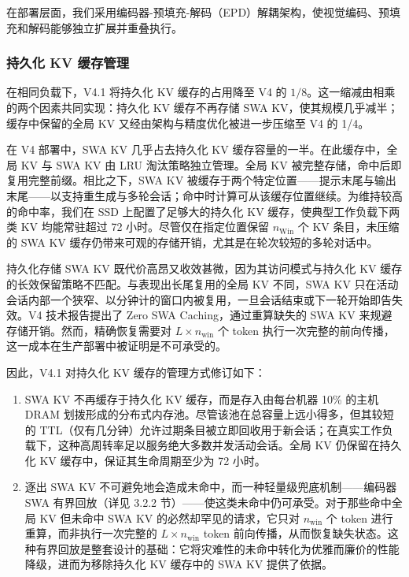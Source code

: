 \documentclass[
  10
]{article}
\begin{document}
在部署层面，我们采用编码器-预填充-解码（EPD）解耦架构，使视觉编码、预填充和解码能够独立扩展并重叠执行。
\subsubsection{持久化 KV 缓存管理}\label{persistent-kv-cache-management}

在相同负载下，V4.1 将持久化 KV 缓存的占用降至 V4 的 \(1 / 8\)。这一缩减由相乘的两个因素共同实现：持久化 KV 缓存不再存储 SWA KV，使其规模几乎减半；缓存中保留的全局 KV 又经由架构与精度优化被进一步压缩至 V4 的 1/4。

在 V4 部署中，SWA KV 几乎占去持久化 KV 缓存容量的一半。在此缓存中，全局 KV 与 SWA KV 由 LRU 淘汰策略独立管理。全局 KV 被完整存储，命中后即复用完整前缀。相比之下，SWA KV 被缓存于两个特定位置——提示末尾与输出末尾——以支持重生成与多轮会话；命中时计算可从该缓存位置继续。为维持较高的命中率，我们在 SSD 上配置了足够大的持久化 KV 缓存，使典型工作负载下两类 KV 均能常驻超过 72 小时。尽管仅在指定位置保留 \(n _ { \mathrm { W i n } }\) 个 KV 条目，未压缩的 SWA KV 缓存仍带来可观的存储开销，尤其是在轮次较短的多轮对话中。

持久化存储 SWA KV 既代价高昂又收效甚微，因为其访问模式与持久化 KV 缓存的长效保留策略不匹配。与表现出长尾复用的全局 KV 不同，SWA KV 只在活动会话内部一个狭窄、以分钟计的窗口内被复用，一旦会话结束或下一轮开始即告失效。V4 技术报告提出了 Zero SWA Caching，通过重算缺失的 SWA KV 来规避存储开销。然而，精确恢复需要对 \(L \times n _ { \mathrm { w i n } }\) 个 token 执行一次完整的前向传播，这一成本在生产部署中被证明是不可承受的。

因此，V4.1 对持久化 KV 缓存的管理方式修订如下：

\begin{enumerate}
\def\labelenumi{\arabic{enumi}.}
\item
  SWA KV 不再缓存于持久化 KV 缓存，而是存入由每台机器 10\% 的主机 DRAM 划拨形成的分布式内存池。尽管该池在总容量上远小得多，但其较短的 TTL（仅有几分钟）允许过期条目被立即回收用于新会话；在真实工作负载下，这种高周转率足以服务绝大多数并发活动会话。全局 KV 仍保留在持久化 KV 缓存中，保证其生命周期至少为 72 小时。
\item
  逐出 SWA KV 不可避免地会造成未命中，而一种轻量级兜底机制——编码器 SWA 有界回放（详见 3.2.2 节）——使这类未命中仍可承受。对于那些命中全局 KV 但未命中 SWA KV 的必然却罕见的请求，它只对 \(n _ { \mathrm { w i n } }\) 个 token 进行重算，而非执行一次完整的 \(L \times n _ { \mathrm { w i n } }\) token 前向传播，从而恢复缺失状态。这种有界回放是整套设计的基础：它将灾难性的未命中转化为优雅而廉价的性能降级，进而为移除持久化 KV 缓存中的 SWA KV 提供了依据。
\end{enumerate}
\end{document}
